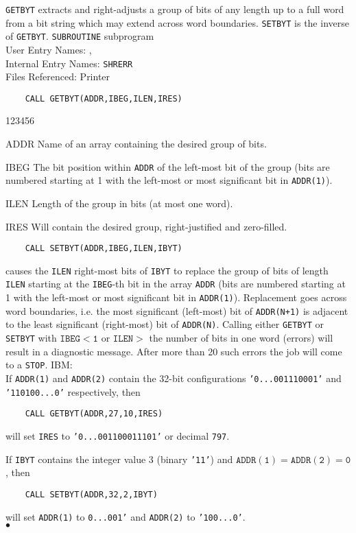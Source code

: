                       
 
                  
{\tt GETBYT} extracts and right-adjusts a group of bits of any length up
to a full word from a bit string which may extend across word
boundaries. {\tt SETBYT} is the inverse of {\tt GETBYT}.
\Structure
{\tt SUBROUTINE} subprogram \\
User Entry Names: , \\
Internal Entry Names: {\tt SHRERR}\\
Files Referenced: Printer
\Usage
\begin{verbatim}
    CALL GETBYT(ADDR,IBEG,ILEN,IRES)
\end{verbatim}
\begin{DLtt}{123456}
\item [ADDR] Name of an array containing the desired group of bits.
\item [IBEG] The bit position within {\tt ADDR} of the
left-most bit of the group (bits are numbered starting at 1 with the
left-most or most significant bit in {\tt ADDR(1)}).
\item [ILEN] Length of the group in bits (at most one word).
\item [IRES] Will contain the desired group, right-justified and
zero-filled.
\end{DLtt}
\begin{verbatim}
    CALL SETBYT(ADDR,IBEG,ILEN,IBYT)
\end{verbatim}
causes the {\tt ILEN} right-most bits of {\tt IBYT} to replace the
group of bits of length {\tt ILEN} starting at the {\tt IBEG}-th bit
in the array {\tt ADDR} (bits are numbered starting at 1 with the
left-most or most significant bit in {\tt ADDR(1)}). Replacement goes
across word boundaries, i.e. the most significant (left-most) bit of
{\tt ADDR(N+1)} is adjacent to the least significant (right-most) bit
of {\tt ADDR(N)}.
\Errorh
Calling either {\tt GETBYT} or {\tt SETBYT} with $\mathtt{IBEG < 1}$
or $\mathtt{ILEN > }$ the number of bits in one word (errors) will result
in a diagnostic message. After more than 20 such errors the job will
come to a {\tt STOP}.
\Examples
IBM: \\
If {\tt ADDR(1)} and {\tt ADDR(2)} contain the
32-bit configurations {\tt '0...001110001'} and {\tt '110100...0'}
respectively, then
\begin{verbatim}
    CALL GETBYT(ADDR,27,10,IRES)
\end{verbatim}
will set {\tt IRES} to {\tt '0...001100011101'} or decimal {\tt 797}.
\par
If {\tt IBYT} contains the integer value 3 (binary {\tt '11'})
and $\mathtt{ADDR(1)=ADDR(2)=0}$, then
\begin{verbatim}
    CALL SETBYT(ADDR,32,2,IBYT)
\end{verbatim}
will set {\tt ADDR(1)} to {\tt 0...001'} and {\tt ADDR(2)} to
{\tt '100...0'}.
\\ $\bullet$
